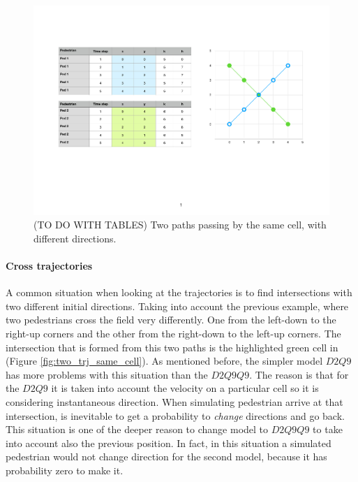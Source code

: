 \documentclass[class=article, crop=false]{standalone}
\begin{document}
\begin{figure}[h]
\centering
\includegraphics[scale=0.5]{draw/eg_distribution_two_trajectories_2}
\captionsetup{width=.7\linewidth}
\caption{(TO DO WITH TABLES) Two paths passing by the same cell, with different directions.}
\label{table:two_trj_same_cell}
\end{figure}

\paragraph{Cross trajectories}
A common situation when looking at the trajectories is to find intersections with two different initial directions.
Taking into account the previous example, where two pedestrians cross the field very differently.
One from the left-down to the right-up corners and the other from the right-down to the left-up corners.
The intersection that is formed from this two paths is the highlighted green cell in (Figure \ref{fig:two_trj_same_cell}).
As mentioned before, the simpler model $D2Q9$ has more problems with this situation than the $D2Q9Q9$.
The reason is that for the $D2Q9$ it is taken into account the velocity on a particular cell so it is considering instantaneous direction. 
When simulating pedestrian arrive at that intersection, is inevitable to get a probability to \emph{change} directions and go back.
This situation is one of the deeper reason to change model to $D2Q9Q9$ to take into account also the previous position.
In fact, in this situation a simulated pedestrian would not change direction for the second model, because it has probability zero to make it.

\FloatBarrier
\end{document}
